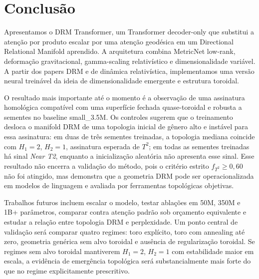 \section{Conclusão}
\label{sec:conclusao}

Apresentamos o DRM Transformer, um Transformer decoder-only que substitui a
atenção por produto escalar por uma atenção geodésica em um Directional
Relational Manifold aprendido. A arquitetura combina MetricNet low-rank,
deformação gravitacional, gamma-scaling relativístico e dimensionalidade
variável. A partir dos papers DRM e de dinâmica relativística, implementamos
uma versão neural treinável da ideia de dimensionalidade emergente e estrutura
toroidal.

O resultado mais importante até o momento é a observação de uma assinatura
homológica compatível com uma superfície fechada quase-toroidal e robusta a
sementes no baseline small\_3.5M. Os controles sugerem que o treinamento
desloca o manifold DRM de uma topologia inicial de gênero alto e instável para
essa assinatura: em duas de três sementes treinadas, a topologia mediana
coincide com $H_1=2$, $H_2=1$, assinatura esperada de $T^2$; em todas as
sementes treinadas há sinal \emph{Near T2}, enquanto a inicialização aleatória
não apresenta esse sinal. Esse resultado não encerra a validação do método,
pois o critério estrito $f_{T^2}\geq 0{,}60$ não foi atingido, mas demonstra que
a geometria DRM pode ser operacionalizada em modelos de linguagem e avaliada
por ferramentas topológicas objetivas.

Trabalhos futuros incluem escalar o modelo, testar ablações em 50M, 350M e
1B+ parâmetros, comparar contra atenção padrão sob orçamento equivalente e
estudar a relação entre topologia DRM e perplexidade. Um ponto central de
validação será comparar quatro regimes: toro explícito, toro com annealing até
zero, geometria genérica sem alvo toroidal e ausência de regularização
toroidal. Se regimes sem alvo toroidal mantiverem $H_1=2$, $H_2=1$ com
estabilidade maior em escala, a evidência de emergência topológica será
substancialmente mais forte do que no regime explicitamente prescritivo.
